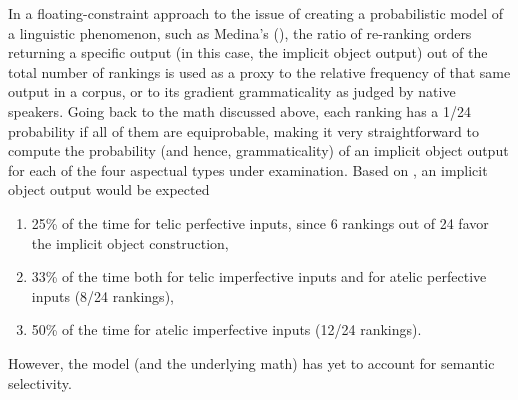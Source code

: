 In a floating-constraint approach to the issue of creating a probabilistic model of a linguistic phenomenon, such as Medina's (), the ratio of re-ranking orders returning a specific output (in this case, the implicit object output) out of the total number of rankings is used as a proxy to the relative frequency of that same output in a corpus, or to its gradient grammaticality as judged by native speakers. Going back to the math discussed above, each ranking has a 1/24 probability if all of them are equiprobable, making it very straightforward to compute the probability (and hence, grammaticality) of an implicit object output for each of the four aspectual types under examination. Based on , an implicit object output would be expected
\begin{enumerate}
    \item 25\% of the time for telic perfective inputs, since 6 rankings out of 24 favor the implicit object construction,
    \item 33\% of the time both for telic imperfective inputs and for atelic perfective inputs (8/24 rankings),
    \item 50\% of the time for atelic imperfective inputs (12/24 rankings).
\end{enumerate}

However, the model (and the underlying math) has yet to account for semantic selectivity.

